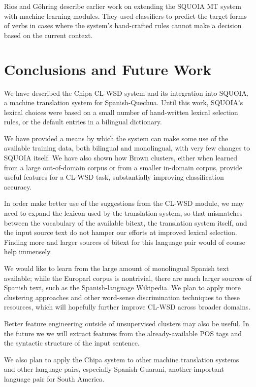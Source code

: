Rios and G\"{o}hring \cite{riosgonzales-gohring:2013:HyTra} describe
earlier work on extending the SQUOIA MT system with machine learning modules.
They used classifiers to predict the target forms of verbs in cases where the
system's hand-crafted rules cannot make a decision based on the current
context.

\section{Conclusions and Future Work}
We have described the Chipa CL-WSD system and its integration into SQUOIA,
a machine translation system for Spanish-Quechua.
Until this work, SQUOIA's lexical choices were based on a small number of
hand-written lexical selection rules, or the default entries in a bilingual
dictionary. 

We have provided a means by which the system can make some use of
the available training data, both bilingual and monolingual, with very few
changes to SQUOIA itself. We have also shown how Brown clusters, either when
learned from a large out-of-domain corpus or from a smaller in-domain corpus,
provide useful features for a CL-WSD task, substantially improving
classification accuracy.

In order make better use of the suggestions from the CL-WSD module, we may
need to expand the lexicon used by the translation system, so that mismatches
between the vocabulary of the available bitext, the translation system itself,
and the input source text do not hamper our efforts at improved lexical
selection. Finding more and larger sources of bitext for this language pair
would of course help immensely.

We would like to learn from the large amount of monolingual Spanish text
available; while the Europarl corpus is nontrivial, there are much larger
sources of Spanish text, such as the Spanish-language Wikipedia. We plan
to apply more clustering approaches and other word-sense discrimination
techniques to these resources, which will hopefully further improve CL-WSD
across broader domains.

Better feature engineering outside of unsupervised clusters may also be useful.
In the future we we will extract features from the already-available POS tags
and the syntactic structure of the input sentence.

We also plan to apply the Chipa system to other machine translation systems and
other language pairs, especially Spanish-Guarani, another important language
pair for South America.

